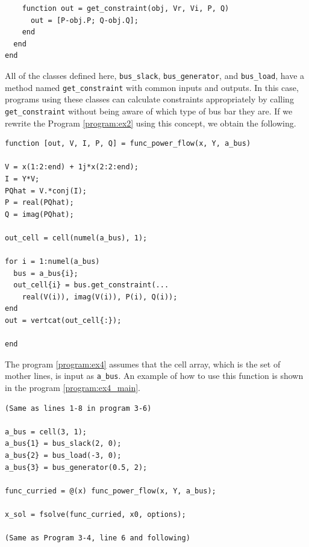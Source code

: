 \documentclass[tombow,dvipdfmx]{corona-a5-1.1}
\begin{document}
\begin{例}
\begin{PROGRAMA}[count,title={bus\_load.m}]
\begin{verbatim}
    function out = get_constraint(obj, Vr, Vi, P, Q)
      out = [P-obj.P; Q-obj.Q];
    end
  end
end
\end{verbatim}
\end{PROGRAMA}

\smallskip

All of the classes defined here, \verb|bus_slack|, \verb|bus_generator|, and \verb|bus_load|, have a method named \verb|get_constraint| with common inputs and outputs.
In this case, programs using these classes can calculate constraints appropriately by calling \verb|get_constraint| without being aware of which type of bus bar they are.
If we rewrite the Program \nobreak\ref{program:ex2} using this concept, we obtain the following.


\smallskip
\begin{PROGRAMA}[count, title={func\_power\_flow.m}]\label{program:ex4}%
\begin{verbatim}
function [out, V, I, P, Q] = func_power_flow(x, Y, a_bus)

V = x(1:2:end) + 1j*x(2:2:end);
I = Y*V;
PQhat = V.*conj(I);
P = real(PQhat);
Q = imag(PQhat);

out_cell = cell(numel(a_bus), 1);

for i = 1:numel(a_bus)
  bus = a_bus{i};
  out_cell{i} = bus.get_constraint(...
    real(V(i)), imag(V(i)), P(i), Q(i));
end
out = vertcat(out_cell{:});

end
\end{verbatim}
\end{PROGRAMA}

The program \nobreak\ref{program:ex4} assumes that the cell array, which is the set of mother lines, is input as \verb|a_bus|.
An example of how to use this function is shown in the program \nobreak\ref{program:ex4_main}.

\smallskip
\begin{PROGRAMA}[count,title={main\_ex4.m}]\label{program:ex4_main}
\begin{verbatim}
(Same as lines 1-8 in program 3-6)

a_bus = cell(3, 1);
a_bus{1} = bus_slack(2, 0);
a_bus{2} = bus_load(-3, 0);
a_bus{3} = bus_generator(0.5, 2);

func_curried = @(x) func_power_flow(x, Y, a_bus);

x_sol = fsolve(func_curried, x0, options);

(Same as Program 3-4, line 6 and following)
\end{verbatim}
\end{PROGRAMA}


\end{例}
\end{document}
